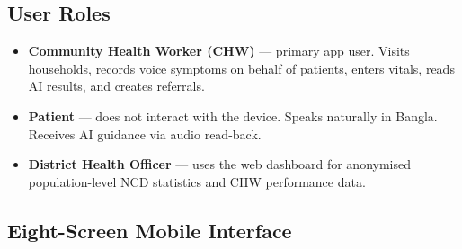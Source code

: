 \documentclass[12pt, a4paper]{article}
\begin{document}
\subsection{User Roles}

\begin{itemize}
  \item \textbf{Community Health Worker (CHW)} — primary app user. Visits households, records voice symptoms on behalf of patients, enters vitals, reads AI results, and creates referrals.
  \item \textbf{Patient} — does not interact with the device. Speaks naturally in Bangla. Receives AI guidance via audio read-back.
  \item \textbf{District Health Officer} — uses the web dashboard for anonymised population-level NCD statistics and CHW performance data.
\end{itemize}

\subsection{Eight-Screen Mobile Interface}
\end{document}
